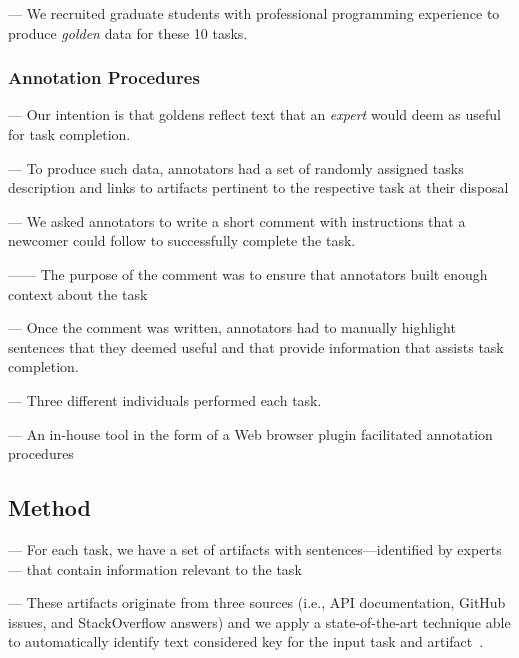 --- We recruited  graduate students with professional programming experience to produce \textit{golden} data for these 10 tasks. \vspace{3mm}


\subsubsection{Annotation Procedures}

--- Our intention is that goldens reflect text that an \textit{expert} would deem as useful for task completion. \vspace{3mm}


--- To produce such data, annotators had a set of randomly assigned tasks description and links to artifacts 
pertinent to the respective task at their disposal \vspace{3mm}

--- We asked annotators to write a short comment with instructions that a newcomer could follow to successfully complete the task.

------ The purpose of the comment was to ensure that annotators built enough context about the task \vspace{3mm}

--- Once the comment was written,  annotators had to manually highlight sentences that they deemed useful and that provide information that assists task completion.

--- Three different individuals performed each task. \vspace{3mm}

--- An in-house tool in the form of a Web browser plugin facilitated annotation procedures

\subsection{Method}

--- For each task, we have a set of artifacts with sentences---identified by experts--- that contain information relevant to the task \vspace{3mm}

--- These artifacts originate from three sources (i.e., API documentation, GitHub issues, and StackOverflow answers) and we apply a state-of-the-art technique able to automatically identify text considered key for the input task and artifact~\cite{nadi2020, Robillard2015, Lotufo2012, Xu2017}. \vspace{3mm}


